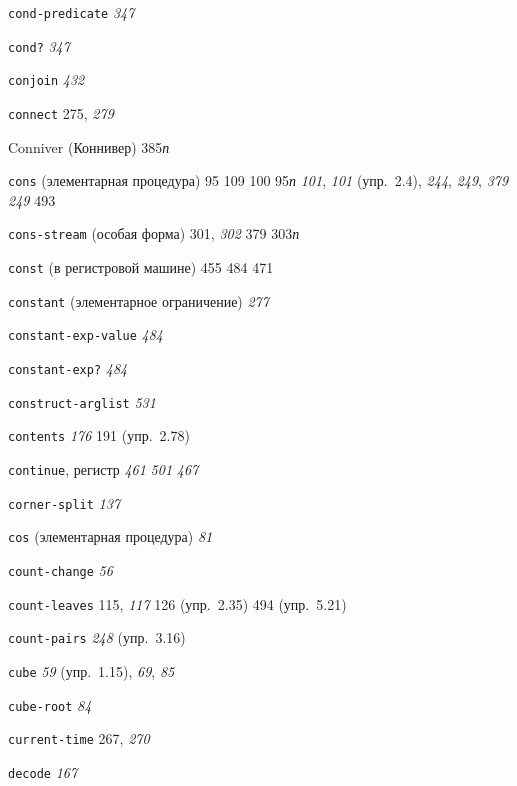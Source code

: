 \begin{theindex}
\item {\texttt{cond-predicate}} {\it 347}
\item {\texttt{cond?}} {\it 347}
\item {\texttt{conjoin}} {\it 432}
\item {\texttt{connect}} 275, {\it 279}
\item {Conniver (Коннивер)} 385{\it п}
\item {\texttt{cons} (элементарная процедура)} 95
   109
   100
   95{\it п}
   {\it 101}, {\it 101} (упр.~2.4), {\it 244}, {\it 249}, {\it 379}
   {\it 249}
   493
\item {\texttt{cons-stream} (особая форма)} 301, {\it 302}
   379
   303{\it п}
\item {\texttt{const} (в регистровой машине)} 455
   484
   471
\item {\texttt{constant} (элементарное ограничение)} {\it 277}
\item {\texttt{constant-exp-value}} {\it 484}
\item {\texttt{constant-exp?}} {\it 484}
\item {\texttt{construct-arglist}} {\it 531}
\item {\texttt{contents}} {\it 176}
   191 (упр.~2.78)
\item {\texttt{continue}, регистр} {\it 461}
   {\it 501}
   {\it 467}
\item {\texttt{corner-split}} {\it 137}
\item {\texttt{cos} (элементарная процедура)} {\it 81}
\item {\texttt{count-change}} {\it 56}
\item {\texttt{count-leaves}} 115, {\it 117}
   126 (упр.~2.35)
   494 (упр.~5.21)
\item {\texttt{count-pairs}} {\it 248} (упр.~3.16)
\item {\texttt{cube}} {\it 59} (упр.~1.15), {\it 69}, {\it 85}
\item {\texttt{cube-root}} {\it 84}
\item {\texttt{current-time}} 267, {\it 270}
\bigskip
\item {\texttt{decode}} {\it 167}

\end{theindex}
